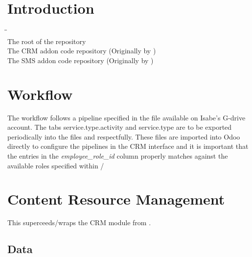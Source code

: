 \documentclass{XArticle}
\title{\Xlrate}
\author{Carel van Dam}
\begin{document}
\maketitle
\tableofcontents

\section{Introduction}

\begin{tabbing}
\hspace{1em}\=\hspace{1em}\=\hspace{8em}\=\\\kill
\nixpath{\xlrate}                  \>\>\> The root of the \Xlrate repository                    \+\\
             \>\> The CRM addon code repository (Originally by \Attooh)   \\
             \>\> The SMS addon code repository (Originally by \Attooh)   \\
\end{tabbing}

\section{Workflow}

The workflow follows a pipeline specified in the  file available on Isabe's G-drive account.
The tabs service.type.activity and service.type are to be exported periodically into the files  and  respectfully.
These files are imported into Odoo directly to configure the pipelines in the CRM interface and it is important that the entries in the \emph{employee\_role\_id} column properly matches against the available roles specified within \Odoo/\Xlrate

\section[\Attooh CRM]{\Attooh Content Resource Management} \label{sec:crm attooh}

This superceeds/wraps the CRM module from \Odoo.

\subsection{Data}
\end{document}

